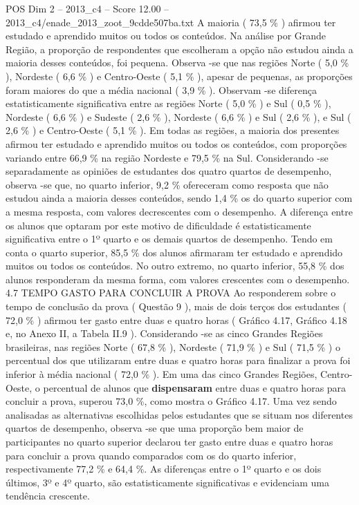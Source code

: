 \begin{textsample}{POS Dim 2 – 2013\_c4 – Score 12.00 – 2013\_c4/enade\_2013\_zoot\_9cdde507ba.txt}
A maioria ( 73,5 \% ) afirmou ter estudado e aprendido muitos ou todos os conteúdos.
Na análise por Grande Região, a proporção de respondentes que escolheram a opção não estudou ainda a maioria desses conteúdos, foi pequena.
Observa -se que nas regiões Norte ( 5,0 \% ), Nordeste ( 6,6 \% ) e Centro-Oeste ( 5,1 \% ), apesar de pequenas, as proporções foram maiores do que a média nacional ( 3,9 \% ).
Observam -se diferença estatisticamente significativa entre as regiões Norte ( 5,0 \% ) e Sul ( 0,5 \% ), Nordeste ( 6,6 \% ) e Sudeste ( 2,6 \% ), Nordeste ( 6,6 \% ) e Sul ( 2,6 \% ), e Sul ( 2,6 \% ) e Centro-Oeste ( 5,1 \% ).
Em todas as regiões, a maioria dos presentes afirmou ter estudado e aprendido muitos ou todos os conteúdos, com proporções variando entre 66,9 \% na região Nordeste e 79,5 \% na Sul.
Considerando -se separadamente as opiniões de estudantes dos quatro quartos de desempenho, observa -se que, no quarto inferior, 9,2 \% ofereceram como resposta que não estudou ainda a maioria desses conteúdos, sendo 1,4 \% os do quarto superior com a mesma resposta, com valores decrescentes com o desempenho.
A diferença entre os alunos que optaram por este motivo de dificuldade é estatisticamente significativa entre o 1º quarto e os demais quartos de desempenho.
Tendo em conta o quarto superior, 85,5 \% dos alunos afirmaram ter estudado e aprendido muitos ou todos os conteúdos.
No outro extremo, no quarto inferior, 55,8 \% dos alunos responderam da mesma forma, com valores crescentes com o desempenho. 4.7 TEMPO GASTO PARA CONCLUIR A PROVA Ao responderem sobre o tempo de conclusão da prova ( Questão 9 ), mais de dois terços dos estudantes ( 72,0 \% ) afirmou ter gasto entre duas e quatro horas ( Gráfico 4.17, Gráfico 4.18 e, no Anexo II, a Tabela II.9 ).
Considerando -se as cinco Grandes Regiões brasileiras, nas regiões Norte ( 67,8 \% ), Nordeste ( 71,9 \% ) e Sul ( 71,5 \% ) o percentual dos que utilizaram entre duas e quatro horas para finalizar a prova foi inferior à média nacional ( 72,0 \% ).
Em uma das cinco Grandes Regiões, Centro-Oeste, o percentual de alunos que \textbf{dispensaram} entre duas e quatro horas para concluir a prova, superou 73,0 \%, como mostra o Gráfico 4.17.
Uma vez sendo analisadas as alternativas escolhidas pelos estudantes que se situam nos diferentes quartos de desempenho, observa -se que uma proporção bem maior de participantes no quarto superior declarou ter gasto entre duas e quatro horas para concluir a prova quando comparados com os do quarto inferior, respectivamente 77,2 \% e 64,4 \%.
As diferenças entre o 1º quarto e os dois últimos, 3º e 4º quarto, são estatisticamente significativas e evidenciam uma tendência crescente.

\end{textsample}
